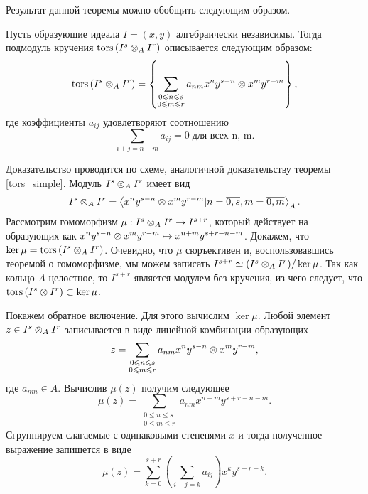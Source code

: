     Результат данной теоремы можно обобщить следующим образом.
    \begin{Theorem}
        Пусть образующие идеала $I = (x, y)$ алгебраически независимы. Тогда подмодуль кручения
        $\textup{tors}\left(I^s \otimes_A I^r\right)$ описывается следующим образом:
        \begin{equation*}
            \textup{tors}\left(I^s \otimes_A I^r\right) = 
                \left\{ \sum_{\substack{0 \leqslant n \leqslant s \\ 0 \leqslant m \leqslant r}}a_{nm}x^ny^{s - n} 
                    \otimes x^my^{r - m}  \right\}, 
        \end{equation*}
        где коэффициенты $a_{ij}$ удовлетворяют соотношению 
        $$\sum_{i + j = n + m} a_{ij} = 0\;\text{для всех n, m}.$$
    \end{Theorem}
    \begin{Proof}
        Доказательство проводится по схеме, аналогичной доказательству теоремы \ref{tors_simple}.
        Модуль $I^s \otimes_A I^r$ имеет вид
        \begin{equation*}
            I^s \otimes_A I^r = \left< x^ny^{s - n} \otimes x^my^{r - m} | 
                n = \overline{0, s}, m = \overline{0, m} \right>_A.
        \end{equation*}
        Рассмотрим гомоморфизм $\mu : I^s \otimes_A I^r \rightarrow I^{s + r}$, который действует на 
        образующих как $x^ny^{s - n} \otimes x^my^{r - m} \mapsto x^{n + m}y^{s + r - n - m}$. 
        Докажем, что $\ker \mu = \textup{tors}\left(I^s \otimes_A I^r\right)$. Очевидно, что $\mu$ сюръективен и, 
        воспользовавшись теоремой о гомоморфизме, мы можем записать 
        $I^{s + r} \simeq (I^s \otimes_A I^r) / \ker \mu$. Так как кольцо $A$ целостное, то $I^{s + r}$
        является модулем без кручения, из чего следует, что $\textup{tors}\left(I^s \otimes I^r\right) \subset \ker \mu$.
        
        Покажем обратное включение. Для этого вычислим $\ker \mu$. Любой элемент $z \in I^s \otimes_A I^r$
        записывается в виде линейной комбинации образующих 
        \begin{equation*}
            z = \sum_{\substack{0 \leqslant n \leqslant s \\ 0 \leqslant m \leqslant r}}a_{nm}x^ny^{s - n} \otimes x^my^{r - m},
        \end{equation*} 
        где $a_{nm} \in A$.
        Вычислив $\mu(z)$ получим следующее
        \begin{equation*}
            \mu(z) = \sum_{\substack{0 \le n \le s \\ 0 \le m \le r}}a_{nm}x^{n + m}y^{s + r - n - m}.
        \end{equation*}
        Сгруппируем слагаемые с одинаковыми степенями $x$ и тогда полученное выражение запишется в виде
        \begin{equation*}
            \mu(z) = \sum_{k = 0}^{s + r}\left( \sum_{i + j = k} a_{ij} \right)x^ky^{s + r - k}.
        \end{equation*}


\end{Proof}
